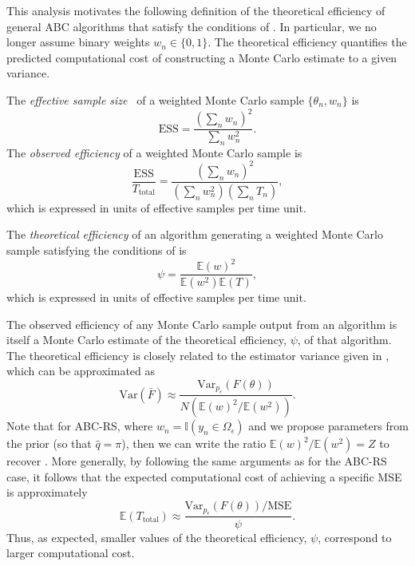 \documentclass[review]{siamonline190516}
\begin{document}
This analysis motivates the following definition of the theoretical efficiency of general ABC algorithms that satisfy the conditions of .
In particular, we no longer assume binary weights $w_n \in \{ 0,1\}$.
The theoretical efficiency quantifies the predicted computational cost of constructing a Monte Carlo estimate to a given variance.

\begin{definition}
\label{def:efficiency:obs}
The \emph{effective sample size}~\cite{Elvira2018} of a weighted Monte Carlo sample $\{ \theta_n, w_n \}$ is 
\[
\mathrm{ESS} = \frac{\left(\sum_n w_n\right)^2}{\sum_n w_n^2}.
\]
The \emph{observed efficiency} of a weighted Monte Carlo sample is
\[
\frac{\mathrm{ESS}}{T_{\mathrm{total}}} = \frac{\left(\sum_n w_n\right)^2}{\left( \sum_n w_n^2 \right) \left( \sum_n T_n \right)},
\]
which is expressed in units of effective samples per time unit.
\end{definition}
\begin{definition}
\label{def:efficiency:th}
The \emph{theoretical efficiency} of an algorithm generating a weighted Monte Carlo sample satisfying the conditions of  is
\[
	\psi = \frac{\mathbb E(w)^2}{\mathbb E(w^2) \mathbb E(T)},
\]
which is expressed in units of effective samples per time unit.
\end{definition}

The observed efficiency of any Monte Carlo sample output from an algorithm is itself a Monte Carlo estimate of the theoretical efficiency, $\psi$, of that algorithm.
The theoretical efficiency is closely related to the estimator variance given in , which can be approximated as
\[
\mathrm{Var} \left( \bar F \right) 
\approx
\frac{\mathrm{Var}_{p_\epsilon}(F(\theta))}{N \left( \mathbb E(w)^2 / \mathbb E(w^2) \right) }.
\]
Note that for ABC-RS, where $w_n = \mathbb I(y_n \in \Omega_\epsilon)$ and we propose parameters from the prior (so that $\hat q = \pi$), then we can write the ratio $\mathbb E(w)^2/\mathbb E(w^2) = Z$ to recover .
More generally, by following the same arguments as for the ABC-RS case, it follows that the expected computational cost of achieving a specific MSE is approximately
\[
\mathbb E(T_{\mathrm{total}}) \approx \frac{\mathrm{Var}_{p_\epsilon}(F(\theta)) / \mathrm{MSE}}{\psi}.
\]
Thus, as expected, smaller values of the theoretical efficiency, $\psi$, correspond to larger computational cost.
\end{document}
